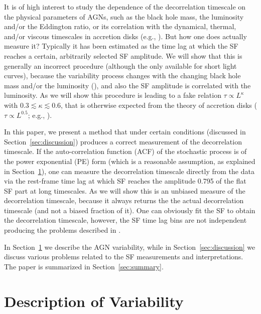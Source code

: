 \documentclass[twocolumn]{aastex6}
\begin{document}
It is of high interest to study the dependence of the decorrelation timescale 
on the physical parameters of AGNs, such as the black hole mass, the luminosity and/or the Eddington ratio, or its correlation with the 
dynamical, thermal, and/or viscous timescales in accretion disks (e.g., \citealt{1989MNRAS.239..289S,2001ApJ...555..775C,2006ASPC..360..265C,2008NewAR..52..253K,2009ApJ...698..895K,2014ApJ...795....2E}).
But how one does actually measure it? Typically it has been estimated as the time lag at which the SF reaches a certain, arbitrarily
selected SF amplitude. We will show that this is generally an incorrect procedure (although the only available for short light curves), because
the variability process changes with the changing black hole mass and/or the luminosity (\citealt{2016A&A...585A.129S,2016ApJ...826..118K}),
and also the SF amplitude is correlated with the luminosity. As we will show this procedure is leading to a fake relation $\tau \propto L^\kappa$ with $0.3\lesssim \kappa \lesssim 0.6$,
that is otherwise expected from the theory of accretion disks ($\tau \propto L^{0.5}$; e.g., \citealt{2002apa..book.....F,2010ApJ...721.1014M}).

In this paper, we present a method that under certain conditions (discussed in Section~\ref{sec:discussion}) produces a correct measurement of
the decorrelation timescale. If the auto-correlation function (ACF) of the stochastic process is of the power exponential (PE) form 
(which is a reasonable assumption, as explained in Section~\ref{sec:var}),
one can measure the decorrelation timescale directly from the data via the rest-frame time lag at which SF reaches the amplitude 0.795 of the 
flat SF part at long timescales. As we will show this is an unbiased measure of the decorrelation timescale, because it always returns
the the actual decorrelation timescale (and not a biased fraction of it).
One can obviously fit the SF to obtain the decorrelation timescale, however, the SF time lag bins are not independent 
producing the problems described in \cite{2010MNRAS.404..931E}.

In Section~\ref{sec:var} we describe the AGN variability, while in Section~\ref{sec:discussion} we discuss various problems related to the SF measurements and interpretations. 
The paper is summarized in Section~\ref{sec:summary}.




\section{Description of Variability}
\label{sec:var}
\end{document}
